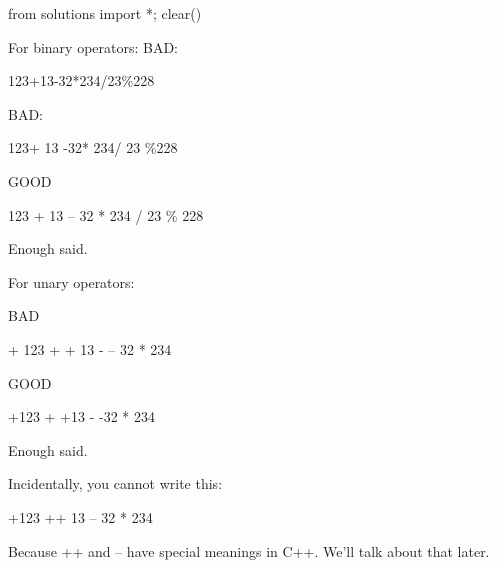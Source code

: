 \begin{python0}
from solutions import *; clear()
\end{python0}

For binary operators:
BAD:
\begin{console}
123+13-32*234/23\%228
\end{console}
BAD:
\begin{console}
123+ 13 -32*    234/    23    \%228
\end{console}
GOOD
\begin{console}
123 + 13 – 32 * 234 / 23 \% 228
\end{console}
Enough said.


For unary operators:

BAD
\begin{console}
+ 123 + + 13 - – 32 * 234
\end{console}
GOOD
\begin{console}
+123 + +13 - -32 * 234
\end{console}
Enough said.


Incidentally, you cannot write this:
\begin{console}
+123 ++ 13 -- 32 * 234
\end{console}

Because ++ and -- have special meanings in C++. We'll talk about that
later.

